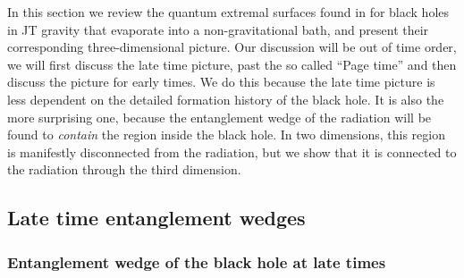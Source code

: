 \documentclass[12pt]{article}
\begin{document}
In this section we review the quantum extremal surfaces found in \cite{Almheiri:2019psf} for black holes in JT gravity that evaporate into a non-gravitational bath, and present their corresponding three-dimensional picture.
Our discussion will be out of time order, we will first discuss the late time picture, past the so called ``Page time'' and then discuss the picture for early times. 
We do this because the late time picture is less dependent on the detailed formation history of the black hole. 
It is also the more surprising one, because the entanglement wedge of the radiation will be found to \emph{contain} the region inside the black hole. 
In two dimensions, this region is manifestly disconnected from the radiation, but we show that it is connected to the radiation through the third dimension.
  
\subsection{Late time entanglement wedges}

\subsubsection{Entanglement wedge of the black hole at late times} 
  
\end{document}
